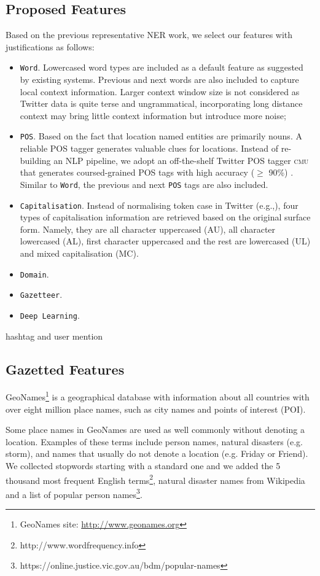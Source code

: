 \documentclass[11pt]{article}
\newcommand{\eg}{e.g.,\xspace}
\newcommand{\cmu}{\textsc{cmu}\xspace}
\newcommand{\feature}[1]{\texttt{#1}\xspace}
\begin{document}
\subsection{Proposed Features}
\label{sec:basic_feature}

Based on the previous representative NER work, we select our features with justifications as follows:
\begin{itemize}
    \item \feature{Word}. Lowercased word types are included as a default feature as suggested by existing systems. Previous and next words are also included to capture local context information. Larger context window size is not considered as Twitter data is quite terse and ungrammatical, incorporating long distance context may bring little context information but introduce more noise;
    \item \feature{POS}. Based on the fact that location named entities are primarily nouns. A reliable POS tagger generates valuable clues for locations. Instead of re-building an NLP pipeline, we adopt an off-the-shelf Twitter POS tagger \cmu that generates coursed-grained POS tags with high accuracy ($\ge$ 90\%) \cite{naacl13owop}. Similar to \feature{Word}, the previous and next \feature{POS} tags are also included.
    \item \feature{Capitalisation}. Instead of normalising token case in Twitter (\eg \cite{emnlp11ritt}), four types of capitalisation information are retrieved based on the original surface form. Namely, they are all character uppercased (AU), all character lowercased (AL), first character uppercased and the rest are lowercased (UL) and mixed capitalisation (MC). 
    \item \feature{Domain}. 
    \item \feature{Gazetteer}. 
    \item \feature{Deep Learning}.
\end{itemize}

hashtag and user mention

\subsection{Gazetted Features}

GeoNames\footnote{GeoNames site: \url{http://www.geonames.org}} is a geographical database with information about all countries with over eight million place names, such as city names and points of interest (POI).

Some place names in GeoNames are used as well commonly without denoting a location.
Examples of these terms include person names, natural disasters (e.g. storm), and names that usually do not denote a location (e.g. Friday or Friend).
We collected stopwords starting with a standard one and we added the 5 thousand most frequent English terms\footnote{http://www.wordfrequency.info}, natural disaster names from Wikipedia and a list of popular person names\footnote{https://online.justice.vic.gov.au/bdm/popular-names}.
\end{document}
